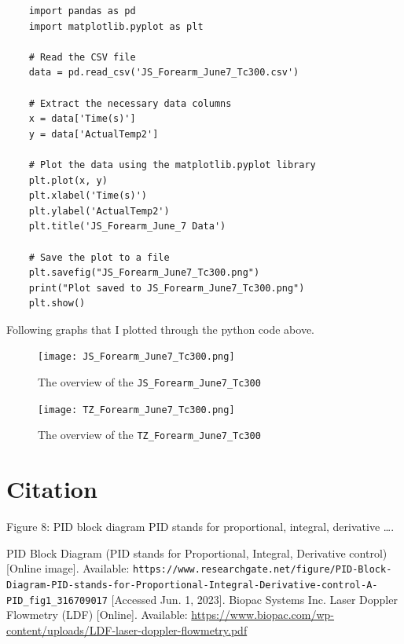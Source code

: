 \documentclass{article}
\begin{document}
 
\lstset{style=mystyle}
\lstset{language=Python}

\begin{lstlisting}
    import pandas as pd
    import matplotlib.pyplot as plt
    
    # Read the CSV file
    data = pd.read_csv('JS_Forearm_June7_Tc300.csv')
    
    # Extract the necessary data columns
    x = data['Time(s)']
    y = data['ActualTemp2']
    
    # Plot the data using the matplotlib.pyplot library
    plt.plot(x, y)
    plt.xlabel('Time(s)')
    plt.ylabel('ActualTemp2')
    plt.title('JS_Forearm_June_7 Data')
    
    # Save the plot to a file
    plt.savefig("JS_Forearm_June7_Tc300.png")
    print("Plot saved to JS_Forearm_June7_Tc300.png")
    plt.show()
\end{lstlisting}
Following graphs that I plotted through the python code above.
\begin{figure}[htpb]
    \centering
    \texttt{[image: JS\_Forearm\_June7\_Tc300.png]}
    \caption{The overview of the \texttt{JS\_Forearm\_June7\_Tc300}}
    \label{fig:s_r}
\end{figure}
\begin{figure}[htpb]
    \centering
    \texttt{[image: TZ\_Forearm\_June7\_Tc300.png]}
    \caption{The overview of the \texttt{TZ\_Forearm\_June7\_Tc300}}
    \label{fig:s_r}
\end{figure}


\section{Citation}
Figure 8: PID block diagram PID stands for proportional, integral, derivative \ldots \cite{pid-reference}.

\begin{thebibliography}{9}
PID Block Diagram (PID stands for Proportional, Integral, Derivative control) [Online image]. Available: \texttt{https://www.researchgate.net/figure/PID-Block-Diagram-PID-stands-for-Proportional-Integral-Derivative-control-A-PID\_fig1\_316709017} [Accessed Jun. 1, 2023].
Biopac Systems Inc. Laser Doppler Flowmetry (LDF) [Online]. Available: \url{https://www.biopac.com/wp-content/uploads/LDF-laser-doppler-flowmetry.pdf}
\end{thebibliography}
\end{document}

